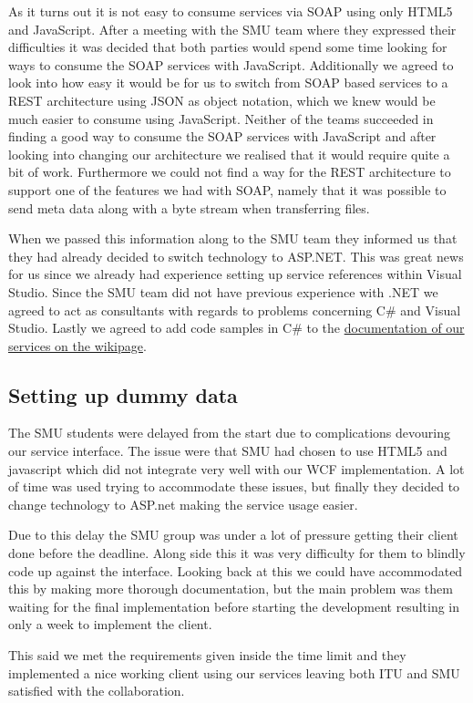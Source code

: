 \documentclass[../report.tex]{subfiles}
\begin{document}
As it turns out it is not easy to consume services via SOAP using only HTML5 and JavaScript.
After a meeting with the SMU team where they expressed their difficulties it was decided that both parties would spend some time looking for ways to consume the SOAP services with JavaScript.
Additionally we agreed to look into how easy it would be for us to switch from SOAP based services to a REST architecture using JSON as object notation, which we knew would be much easier to consume using JavaScript.
Neither of the teams succeeded in finding a good way to consume the SOAP services with JavaScript and after looking into changing our architecture we realised that it would require quite a bit of work. 
Furthermore we could not find a way for the REST architecture to support one of the features we had with SOAP, namely that it was possible to send meta data along with a byte stream when transferring files.

When we passed this information along to the SMU team they informed us that they had already decided to switch technology to ASP.NET.
This was great news for us since we already had experience setting up service references within Visual Studio.
Since the SMU team did not have previous experience with .NET we agreed to act as consultants with regards to problems concerning C\# and Visual Studio.
Lastly we agreed to add code samples in C\# to the \href{https://wiki.smu.edu.sg/is411/Team8\_Services\_Documentation}{documentation of our services on the wikipage}.

\subsection{Setting up dummy data}

The SMU students were delayed from the start due to complications devouring our service interface. The issue were that SMU had chosen to use HTML5 and javascript which did not integrate very well with our WCF implementation. A lot of time was used trying to accommodate these issues, but finally they decided to change technology to ASP.net making the service usage easier.

Due to this delay the SMU group was under a lot of pressure getting their client done before the deadline. Along side this it was very difficulty for them to blindly code up against the interface. Looking back at this we could have accommodated this by making more thorough documentation, but the main problem was them waiting for the final implementation before starting the development resulting in only a week to implement the client.

This said we met the requirements given inside the time limit and they implemented a nice working client using our services leaving both ITU and SMU satisfied with the collaboration.
\end{document}
